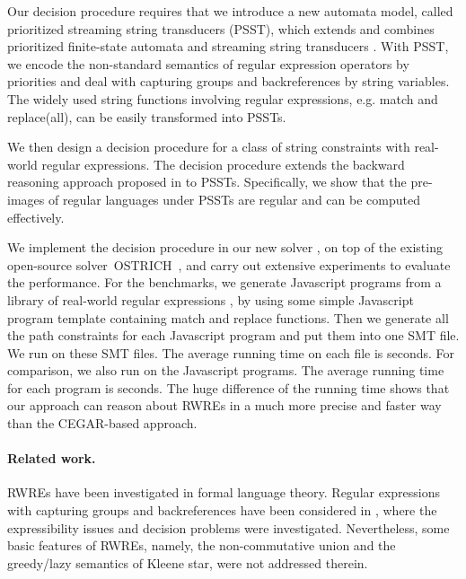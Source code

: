 Our decision procedure requires that we introduce a new automata model, called 
prioritized streaming string transducers (PSST), which extends and combines 
prioritized finite-state automata \cite{BM17} and streaming string transducers 
\cite{AC10,AD11}. With PSST, we encode the non-standard semantics of regular 
expression operators by priorities and deal with capturing groups and backreferences by string variables. 
The widely used string functions involving regular expressions, e.g. match and replace(all), can be easily transformed into PSSTs. 

We then design a decision procedure for a class of string constraints with real-world regular expressions. The decision procedure extends the backward reasoning approach proposed in \cite{CHL+19} to PSSTs. Specifically, we show that the pre-images of regular languages under PSSTs are regular and can be computed effectively. 

We implement the decision procedure in our new solver \ostrich,
on top of the existing open-source solver~OSTRICH~\cite{CHL+19},
 and carry out extensive experiments to evaluate the performance. For the benchmarks, we generate  Javascript programs from a library of real-world regular expressions \cite{DMC+19}, by using some simple Javascript program template containing match and replace functions.  Then we generate all the path constraints for each Javascript program and put them into one SMT file. We run {\ostrich} on these SMT files. The average running time on each file is  seconds. For comparison, we also run \expose{} on the Javascript programs. The average running time for each program is  seconds. The huge difference of the running time shows that our approach can reason about RWREs in a much more precise and faster way than the CEGAR-based approach.


\paragraph*{Related work.}

RWREs have been investigated in formal language theory. Regular expressions with capturing groups and backreferences have been considered in \cite{CSY03,CN09,Freydenberger13,Schmid16,FS19}, where the expressibility issues and decision problems were investigated. Nevertheless, some basic features of RWREs, namely, the non-commutative union and the greedy/lazy semantics of Kleene star, were not addressed therein.

